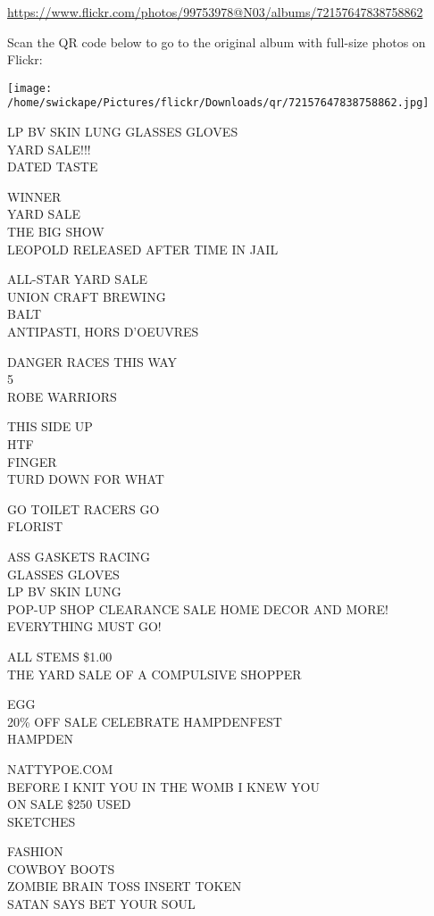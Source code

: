 \documentclass[10pt,letterpaper]{article}
\begin{document}
\url{https://www.flickr.com/photos/99753978@N03/albums/72157647838758862}

Scan the QR code below to go to the original album with full-size photos on Flickr:

\texttt{[image: /home/swickape/Pictures/flickr/Downloads/qr/72157647838758862.jpg]}


LP BV SKIN LUNG GLASSES GLOVES\\
YARD SALE!!!\\
DATED TASTE

WINNER\\
YARD SALE\\
THE BIG SHOW\\
LEOPOLD RELEASED AFTER TIME IN JAIL

ALL{-}STAR YARD SALE\\
UNION CRAFT BREWING\\
BALT\\
ANTIPASTI, HORS D'OEUVRES

DANGER RACES THIS WAY\\
5\\
ROBE WARRIORS

THIS SIDE UP\\
HTF\\
FINGER\\
TURD DOWN FOR WHAT

GO TOILET RACERS GO\\
FLORIST

ASS GASKETS RACING\\
GLASSES GLOVES\\
LP BV SKIN LUNG\\
POP{-}UP SHOP CLEARANCE SALE HOME DECOR AND MORE! EVERYTHING MUST GO!

ALL STEMS \$1.00\\
THE YARD SALE OF A COMPULSIVE SHOPPER

EGG\\
20\% OFF SALE CELEBRATE HAMPDENFEST\\
HAMPDEN

NATTYPOE.COM\\
BEFORE I KNIT YOU IN THE WOMB I KNEW YOU\\
ON SALE \$250 USED\\
SKETCHES

FASHION\\
COWBOY BOOTS\\
ZOMBIE BRAIN TOSS INSERT TOKEN\\
SATAN SAYS BET YOUR SOUL
\end{document}
